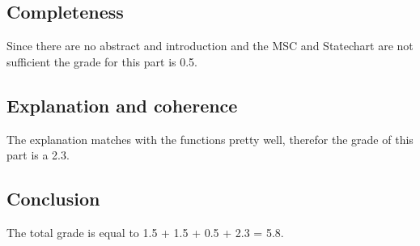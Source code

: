 \documentclass[a4paper,11pt]{article}
\begin{document}
    \subsection{Completeness}
    Since there are no abstract and introduction and the MSC and Statechart are not sufficient the grade for this part is 0.5.\\

    \subsection{Explanation and coherence}
    The explanation matches with the functions pretty well, therefor the grade of this part is a 2.3.\\

    \subsection{Conclusion}
    The total grade is equal to 1.5 + 1.5 + 0.5 + 2.3 = 5.8.\\
\end{document}
